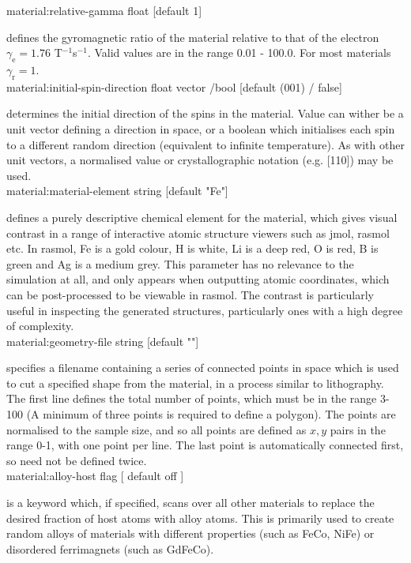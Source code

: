 {\zicf material:relative-gamma float [default 1]} defines the gyromagnetic ratio 
of the material relative to that of the electron $\gamma_{\mathrm{e}} = 1.76$ T$^{-1}$s$^{-1}$. Valid values are in the range 0.01 - 100.0. For most materials $\gamma_{\mathrm{r}} = 1$.\\

{\zicf material:initial-spin-direction float vector /bool [default (001) / false]} determines the initial direction of the spins in the material. Value can wither be a unit vector defining a direction in space, or a boolean which initialises each spin to a different random direction (equivalent to infinite temperature). As with other unit vectors, a  normalised value or crystallographic notation (e.g. [110]) may be used.\\

{\zicf material:material-element string [default "Fe"]} defines a purely descriptive chemical element for the material, which gives visual contrast in a range of interactive atomic structure viewers such as jmol, rasmol etc. In rasmol, Fe is a gold colour, H is white, Li is a deep red, O is red, B is green and Ag is a medium grey. This parameter has no relevance to the simulation at all, and only appears when outputting atomic coordinates, which can be post-processed to be viewable in rasmol. The contrast is particularly useful in inspecting the generated structures, particularly ones with a high degree of complexity.\\ 

{\zicf material:geometry-file string [default ""]} specifies a filename containing a series of connected points in space which is used to cut a specified shape from the material, in a process similar to lithography. The first line defines the total number of points, which must be in the range 3-100 (A minimum of three points is required to define a polygon). The points are normalised to the sample size, and so all points are defined as $x,y$ pairs in the range 0-1, with one point per line. The last point is automatically connected first, so need not be defined twice.\\

{\zicf material:alloy-host flag [ default off ]} is a keyword which, if specified, scans over all other materials to replace the desired fraction of host atoms with alloy atoms. This is primarily used to create random alloys of materials with different properties (such as FeCo, NiFe) or disordered ferrimagnets (such as GdFeCo).\\

